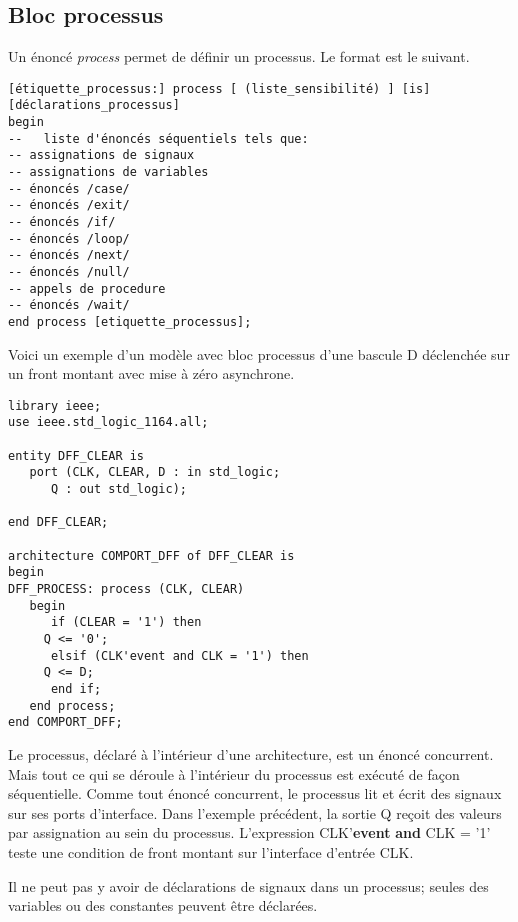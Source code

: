 \documentclass[11pt]{article}
\begin{document}
\subsection{Bloc processus}
\label{sec:org0d833eb}

Un énoncé \emph{process} permet de définir un processus. Le format est le
suivant.

\begin{listing}[htbp]
\begin{verbatim}
[étiquette_processus:] process [ (liste_sensibilité) ] [is]
[déclarations_processus]
begin
--   liste d'énoncés séquentiels tels que:
-- assignations de signaux 
-- assignations de variables
-- énoncés /case/
-- énoncés /exit/
-- énoncés /if/ 
-- énoncés /loop/ 
-- énoncés /next/
-- énoncés /null/
-- appels de procedure
-- énoncés /wait/
end process [etiquette_processus];
\end{verbatim}
\caption{Bloc processus}
\end{listing}

Voici un exemple d'un modèle avec bloc processus d'une bascule D
déclenchée sur un front montant avec mise à zéro asynchrone.

\begin{listing}[htbp]
\begin{verbatim}
library ieee;
use ieee.std_logic_1164.all;

entity DFF_CLEAR is
   port (CLK, CLEAR, D : in std_logic;
      Q : out std_logic);

end DFF_CLEAR;

architecture COMPORT_DFF of DFF_CLEAR is
begin
DFF_PROCESS: process (CLK, CLEAR)
   begin
      if (CLEAR = '1') then
	 Q <= '0';
      elsif (CLK'event and CLK = '1') then
	 Q <= D;
      end if;
   end process;
end COMPORT_DFF;
\end{verbatim}
\caption{Bascule D, front montant, mise à zéro asynchrone}
\end{listing}

Le processus, déclaré à l'intérieur d'une architecture, est un énoncé
concurrent.  Mais tout ce qui se déroule à l'intérieur du processus
est exécuté de façon séquentielle. Comme tout énoncé concurrent, le
processus lit et écrit des signaux sur ses ports d'interface. Dans
l'exemple précédent, la sortie Q reçoit des valeurs par assignation au
sein du processus. L'expression CLK'\textbf{event} \textbf{and} CLK = '1' teste une
condition de front montant sur l'interface d'entrée CLK.

Il ne peut pas y avoir de déclarations de signaux dans un processus;
seules des variables ou des constantes peuvent être déclarées.
\end{document}
